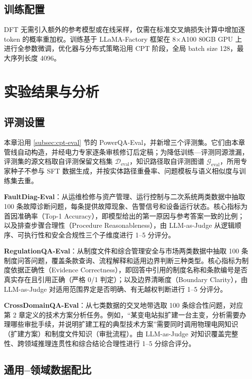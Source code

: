 \documentclass[fontset=fandol,type=master,campus=shenzhen,etitleauto=true]{hithesisbook}
\begin{document}
\subsection{训练配置}\label{subsec:sft-config}

DFT 无需引入额外的参考模型或在线采样，仅需在标准交叉熵损失计算中增加逐 token 的概率重加权。训练基于 LLaMA-Factory 框架在 8×A100 80GB GPU 上进行全参数微调，优化器与分布式策略沿用 CPT 阶段，全局 batch size 128，最大序列长度 4096。

\section{实验结果与分析}\label{sft-ux8badux7ec3ux4e0eux5b9eux9a8cux7ed3ux679c}

\subsection{评测设置}\label{subsec:sft-eval}

本章沿用 \ref{subsec:cpt-eval} 节的 PowerQA-Eval，并新增三个评测集。它们由本章管线自动构造，并经电力专家逐条审核修订后定稿；为降低训练—评测同源泄漏，评测集的源文档取自评测保留文档集 $\mathcal{D}_{\text{eval}}$，知识路径取自评测图谱 $\mathcal{G}_{\text{eval}}$，所用专家种子不参与 SFT 数据生成，并按实体路径重叠率、问题模板与语义相似度与训练集去重。

\textbf{FaultDiag-Eval}：从运维检修与资产管理、运行控制与二次系统两类数据中抽取 100 条故障诊断问题，每条提供故障现象、告警信号和设备运行状态。核心指标为首因准确率（Top-1 Accuracy），即模型给出的第一原因与参考答案一致的比例；以及排查步骤合理性（Procedure Reasonableness），由 LLM-as-Judge 从逻辑顺序、可执行性和安全合规性三个子维度进行 1--5 分评分。

\textbf{RegulationQA-Eval}：从制度文件和综合管理安全与市场两类数据中抽取 100 条制度问答问题，覆盖条款查询、流程解释和适用边界判断三种类型。核心指标为制度依据正确性（Evidence Correctness），即回答中引用的制度名称和条款编号是否真实存在且引用正确（严格 0/1 判定）；以及边界清晰度（Boundary Clarity），由 LLM-as-Judge 对适用范围界定是否明确、有无越权判断进行 1--5 分评分。

\textbf{CrossDomainQA-Eval}：从七类数据的交叉地带选取 100 条综合性问题，对应第 2 章定义的技术方案分析任务。例如，“某变电站拟扩建一台主变，分析需要办理哪些审批手续，并说明扩建工程的典型技术方案”需要同时调用物理电网知识（扩建方案）和制度文件知识（审批流程）。由 LLM-as-Judge 对知识覆盖完整性、跨领域推理连贯性和综合结论合理性进行 1--5 分综合评分。
\subsection{通用--领域数据配比}\label{subsec:sft-ratio}
\end{document}

